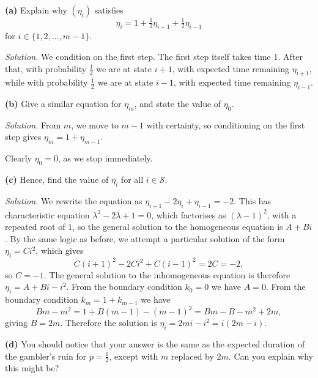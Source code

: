 \documentclass[
  a4paper,
]{article}
\theoremstyle{definition}
\theoremstyle{definition}
\theoremstyle{definition}
\theoremstyle{remark}
\begin{document}
\textbf{(a)} Explain why \((\eta_i)\) satisfies
\[ \eta_i = 1 + \tfrac12 \eta_{i+1} +\tfrac12 \eta_{i-1} \]
for \(i \in \{1,2,\dots,m-1\}\).

\begin{myanswers}

\emph{Solution.} We condition on the first step. The first step itself takes time 1. After that, with probability \(\frac12\) we are at state \(i+1\), with expected time remaining \(\eta_{i+1}\), while with probability \(\frac12\) we are at state \(i-1\), with expected time remaining \(\eta_{i-1}\).

\end{myanswers}

\textbf{(b)} Give a similar equation for \(\eta_m\), and state the value of \(\eta_0\).

\begin{myanswers}

\emph{Solution.} From \(m\), we move to \(m-1\) with certainty, so conditioning on the first step gives \(\eta_m = 1 + \eta_{m-1}\).

Clearly \(\eta_0 = 0\), as we stop immediately.

\end{myanswers}

\textbf{(c)} Hence, find the value of \(\eta_i\) for all \(i \in \mathcal S\).

\begin{myanswers}

\emph{Solution.} We rewrite the equation as \(\eta_{i+1} - 2 \eta_i + \eta_{i-1} = -2\). This has characteristic equation \(\lambda^2 - 2\lambda + 1 = 0\), which factorises as \((\lambda-1)^2\), with a repeated root of \(1\), so the general solution to the homogeneous equation is \(A + Bi\). By the same logic as before, we attempt a particular solution of the form \(\eta_i = Ci^2\), which gives
\[ C(i+1)^2 - 2Ci^2 + C(i-1)^2 = 2C = -2 ,   \]
so \(C = -1\). The general solution to the inhomogeneous equation is therefore \(\eta_i = A + Bi - i^2\). From the boundary condition \(k_0 = 0\) we have \(A = 0\). From the boundary condition \(k_m = 1 + k_{m-1}\) we have
\[ Bm - m^2 = 1 + B(m-1) - (m-1)^2 = Bm - B - m^2 +2m  , \]
giving \(B = 2m\). Therefore the solution is \(\eta_i = 2mi - i^2 = i(2m - i)\).

\end{myanswers}

\textbf{(d)} You should notice that your answer is the same as the expected duration of the gambler's ruin for \(p = \frac12\), except with \(m\) replaced by \(2m\). Can you explain why this might be?
\end{document}
